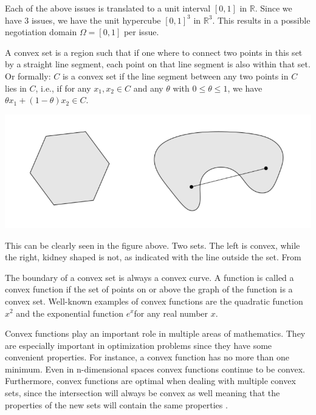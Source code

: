 Each of the above issues is translated to a unit interval $[0, 1]$ in $\mathbb{R}$. Since we have $3$ issues, we have the unit hypercube $[0, 1]^3$ in  $\mathbb{R}^3$. This results in a possible negotiation domain $\Omega = [0,1]$ per issue.
	\begin{definition*}[Convexity]

	\label{def:convex}
	A convex set is a region such that if one where to connect two points in this set by a straight line segment, each point on that line segment is also within that set. Or formally: $C$ is a convex set if the line segment between any two points in $C$ lies in $C$, i.e., if for any $x_1, x_2 \in C$ and any $\theta$ with $0 \leq \theta \leq 1$, we have $\theta x_1 + (1 - \theta )x_2 \in C$.
	
	{\centering
		\includegraphics[width=0.7\linewidth]{img/convex}\par}
	
	This can be clearly seen in the figure above. Two sets. The left is convex, while the right, kidney shaped is not, as indicated with the line outside the set. From \citep{boyd2004convex}
	
	The boundary of a convex set is always a convex curve. A function is called a convex function if the set of points on or above the graph of the function is a convex set. Well-known examples of convex functions are the quadratic function $x^{2}$ and the exponential function $e^{x} $for any real number $x$.
	
	Convex functions play an important role in multiple areas of mathematics. They are especially important in optimization problems since they have some convenient properties. For instance, a convex function has no more than one minimum. Even in n-dimensional spaces convex functions continue to be convex. Furthermore, convex functions are optimal when dealing with multiple convex sets, since the intersection will always be convex as well meaning that the properties of the new sets will contain the same properties  \citep{boyd2004convex}. 
	
\end{definition*}


